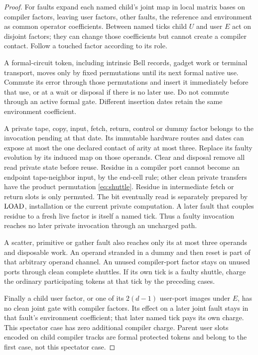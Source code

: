 \begin{proof}
For faults expand each named child's joint map in local matrix bases on compiler factors, leaving user factors, other faults, the reference and environment as common operator coefficients. Between named ticks child $U$ and user $E$ act on disjoint factors; they can change those coefficients but cannot create a compiler contact. Follow a touched factor according to its role.

A formal-circuit token, including intrinsic Bell records, gadget work or terminal transport, moves only by fixed permutations until its next formal native use. Commute its error through those permutations and insert it immediately before that use, or at a wait or disposal if there is no later use. Do not commute through an active formal gate. Different insertion dates retain the same environment coefficient.

A private tape, copy, input, fetch, return, control or dummy factor belongs to the invocation pending at that date. Its immutable hardware routes and dates can expose at most the one declared contact of arity at most three. Replace its faulty evolution by its induced map on those operands. Clear and disposal remove all read private state before reuse. Residue in a compiler port cannot become an endpoint tape-neighbor input, by the end-cell rule; other clean private transfers have the product permutation \eqref{eq:shuttle}. Residue in intermediate fetch or return slots is only permuted. The bit eventually read is separately prepared by $\operatorname{LOAD}$, installation or the current private computation. A later fault that couples residue to a fresh live factor is itself a named tick. Thus a faulty invocation reaches no later private invocation through an uncharged path.

A scatter, primitive or gather fault also reaches only its at most three operands and disposable work. An operand stranded in a dummy and then reset is part of that arbitrary operand channel. An unused compiler-port factor stays on unused ports through clean complete shuttles. If its own tick is a faulty shuttle, charge the ordinary participating tokens at that tick by the preceding cases.

Finally a child user factor, or one of its $2(d-1)$ user-port images under $E$, has no clean joint gate with compiler factors. Its effect on a later joint fault stays in that fault's environment coefficient; that later named tick pays its own charge. This spectator case has zero additional compiler charge. Parent user slots encoded on child compiler tracks are formal protected tokens and belong to the first case, not this spectator case.


\end{proof}
